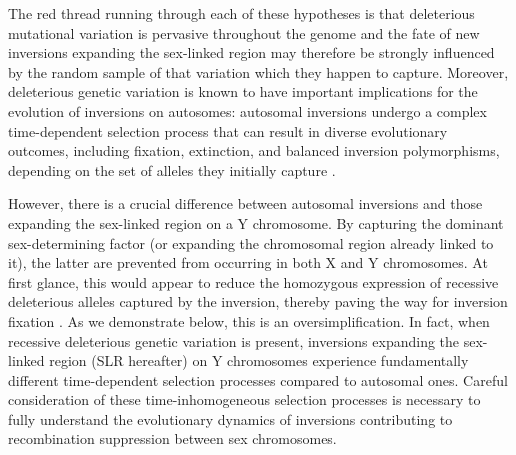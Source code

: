 \documentclass[11pt]{article}
\begin{document}
The red thread running through each of these hypotheses is that deleterious mutational variation is pervasive throughout the genome \citep{Muller1950,Crow1970b,Charlesworth-etal-1993} and the fate of new inversions expanding the sex-linked region may therefore be strongly influenced by the random sample of that variation which they happen to capture. Moreover, deleterious genetic variation is known to have important implications for the evolution of inversions on autosomes: autosomal inversions undergo a complex time-dependent selection process that can result in diverse evolutionary outcomes, including fixation, extinction, and balanced inversion polymorphisms, depending on the set of alleles they initially capture \citep{Nei1967,Charlesworth1973,ConnallonOlito2020}. 

However, there is a crucial difference between autosomal inversions and those expanding the sex-linked region on a Y chromosome. By capturing the dominant sex-determining factor (or expanding the chromosomal region already linked to it), the latter are prevented from occurring in both X and Y chromosomes. At first glance, this would appear to reduce the homozygous expression of recessive deleterious alleles captured by the inversion, thereby paving the way for inversion fixation \citep{Ironside2010, Jay2021}. As we demonstrate below, this is an oversimplification. In fact, when recessive deleterious genetic variation is present, inversions expanding the sex-linked region (SLR hereafter) on Y chromosomes experience fundamentally different time-dependent selection processes compared to autosomal ones. Careful consideration of these time-inhomogeneous selection processes is necessary to fully understand the evolutionary dynamics of inversions contributing to recombination suppression between sex chromosomes. 
\end{document}
